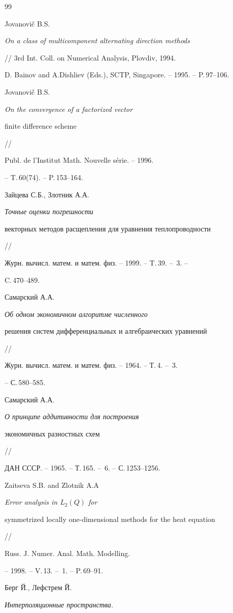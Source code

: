 \begin{thebibliography}{99}


Jovanovi\v{c} B.S.


{\it On a class of multicomponent alternating directi\-on methods}


// 3rd Int. Coll. on Numerical Analysis, Plovdiv, 1994. 


D. Bainov and A.Dishliev (Eds.), SCTP, Singapore. -- 1995. -- P.\,97--106.




Jovanovi\v{c} B.S. {\it On the convergence of a factorized vector


finite difference scheme} //


Publ. de l'Institut Math. Nouvelle s\'erie. -- 1996.


-- T.\,60(74). -- P.\,153--164.




Зайцева С.Б., Злотник А.А. {\it Точные оценки погрешности


векторных методов расщепления для уравнения теплопроводности} //


Журн. вычисл. матем. и матем. физ. -- 1999. -- T.\,39. -- \No\,3. --


C.\,470--489.




Самарский А.А. {\it Об одном экономичном алгоритме численного


решения систем дифференциальных и алгебраических уравнений} //


Журн. вычисл. матем. и матем. физ. -- 1964. -- Т.\,4. -- \No\,3.


-- С.\,580--585.




Самарский А.А. {\it О принципе аддитивности для построения 


экономичных разностных схем} //


ДАН СССР. -- 1965. -- Т.\,165. -- \No\,6. -- С.\,1253--1256.




Zaitseva S.B. and Zlotnik A.A {\it Error analysis in $L_2(Q)$ for


symmetrized locally one-dimensional methods for the heat equation} //


Russ. J. Numer. Anal. Math. Modelling.


-- 1998. -- V.\,13. -- \No\,1. -- P.\,69--91.




Берг Й., Лефстрем Й. {\it Интерполяционные пространства.


}
\end{thebibliography}
